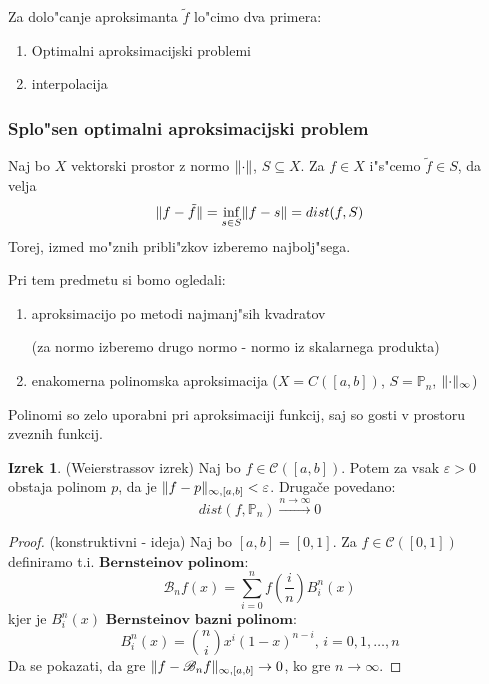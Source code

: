 \documentclass[a4paper,12pt]{article}
\DeclarePairedDelimiter\norm{\lVert}{\rVert}
\theoremstyle{definition}
\newtheorem{theorem}[counter]{Izrek}
\theoremstyle{remark}
\newcommand{\Pp}{\mathbb{P}}
\begin{document}
Za dolo"canje aproksimanta $\tilde{f}$ lo"cimo dva primera:
\begin{enumerate}
    \item Optimalni aproksimacijski problemi
    \item interpolacija
\end{enumerate}


\subsubsection{Splo"sen optimalni aproksimacijski problem}
Naj bo $X$ vektorski prostor z normo $\norm{\cdot}$, $S \subseteq X$. Za $f \in X$ i"s"cemo $\tilde{f} \in S$, da velja
\begin{equation*}
    \norm{f - \tilde{f}} = \inf_{s \in S} \norm{f - s} = dist(f, S)
\end{equation*}
Torej, izmed mo"znih pribli"zkov izberemo najbolj"sega.


Pri tem predmetu si bomo ogledali:
\begin{enumerate}
    \item aproksimacijo po metodi najmanj"sih kvadratov
    
    (za normo izberemo drugo normo - normo iz skalarnega produkta)
    \item enakomerna polinomska aproksimacija ($X = C([a, b])$, $S = \Pp_n$, $\norm{\cdot}_{\infty}$)
\end{enumerate}

Polinomi so zelo uporabni pri aproksimaciji funkcij, saj so gosti v prostoru zveznih funkcij.

\begin{theorem} (Weierstrassov izrek)
    Naj bo $f \in \mathscr{C} ([a, b])$. Potem za vsak $\varepsilon > 0$ obstaja polinom $p$, da je $\norm{f - p}_{\infty, [a, b]} < \varepsilon$. Drugače povedano:
    \begin{equation*}
        dist(f, \Pp_n) \stackrel{n \to \infty}{\longrightarrow} 0
    \end{equation*}
\end{theorem}

\begin{proof}(konstruktivni - ideja)
    Naj bo $[a, b] = [0, 1]$. Za $f \in \mathscr{C} ([0, 1])$ definiramo t.i. $\textbf{Bernsteinov polinom}$:
    \begin{equation*}
        \mathscr{B}_n f (x) = \sum_{i = 0}^{n} f (\frac{i}{n}) B_i^n(x)
    \end{equation*}
    kjer je $B_i^n(x)$ $\textbf{Bernsteinov bazni polinom}$:
    \begin{equation*}
        B_i^n (x) = {n \choose i} x^i (1-x)^{n-i} \text{, } i = 0, 1, \dots, n  
    \end{equation*}
    Da se pokazati, da gre $\norm{f - \mathscr{B}_n f}_{\infty, [a, b]} \to 0$, ko gre $n \to \infty$.
\end{proof}
\end{document}
